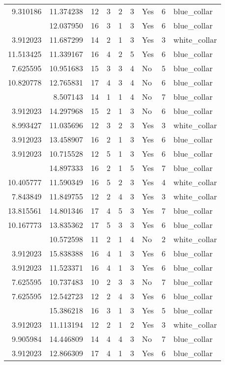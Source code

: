 \documentclass[
]{article}
\begin{document}
\begin{longtable}[t]{rrrrrllrl}
9.310186 & 11.374238 & 12 & 3 & 2 & 3 & Yes & 6 & blue\_collar\\
\addlinespace
3.912023 & 12.037950 & 16 & 3 & 1 & 3 & Yes & 6 & blue\_collar\\
3.912023 & 11.687299 & 14 & 2 & 1 & 3 & Yes & 3 & white\_collar\\
11.513425 & 11.339167 & 16 & 4 & 2 & 5 & Yes & 6 & blue\_collar\\
7.625595 & 10.951683 & 15 & 3 & 3 & 4 & No & 5 & blue\_collar\\
10.820778 & 12.765831 & 17 & 4 & 3 & 4 & No & 6 & blue\_collar\\
\addlinespace
3.912023 & 8.507143 & 14 & 1 & 1 & 4 & No & 7 & blue\_collar\\
3.912023 & 14.297968 & 15 & 2 & 1 & 3 & No & 6 & blue\_collar\\
8.993427 & 11.035696 & 12 & 3 & 2 & 3 & Yes & 3 & white\_collar\\
3.912023 & 13.458907 & 16 & 2 & 1 & 3 & Yes & 6 & blue\_collar\\
3.912023 & 10.715528 & 12 & 5 & 1 & 3 & Yes & 6 & blue\_collar\\
\addlinespace
3.912023 & 14.897333 & 16 & 2 & 1 & 5 & Yes & 7 & blue\_collar\\
10.405777 & 11.590349 & 16 & 5 & 2 & 3 & Yes & 4 & white\_collar\\
7.843849 & 11.849755 & 12 & 2 & 4 & 3 & Yes & 3 & white\_collar\\
13.815561 & 14.801346 & 17 & 4 & 5 & 3 & Yes & 7 & blue\_collar\\
10.167773 & 13.835362 & 17 & 5 & 3 & 3 & Yes & 6 & blue\_collar\\
\addlinespace
3.912023 & 10.572598 & 11 & 2 & 1 & 4 & No & 2 & white\_collar\\
3.912023 & 15.838388 & 16 & 4 & 1 & 3 & Yes & 6 & blue\_collar\\
3.912023 & 11.523371 & 16 & 4 & 1 & 3 & Yes & 6 & blue\_collar\\
7.625595 & 10.737483 & 10 & 2 & 3 & 3 & No & 7 & blue\_collar\\
7.625595 & 12.542723 & 12 & 2 & 4 & 3 & Yes & 6 & blue\_collar\\
\addlinespace
3.912023 & 15.386218 & 16 & 3 & 1 & 3 & Yes & 5 & blue\_collar\\
3.912023 & 11.113194 & 12 & 2 & 1 & 2 & Yes & 3 & white\_collar\\
9.905984 & 14.446809 & 14 & 4 & 4 & 3 & No & 7 & blue\_collar\\
3.912023 & 12.866309 & 17 & 4 & 1 & 3 & Yes & 6 & blue\_collar\\

\end{longtable}
\end{document}
